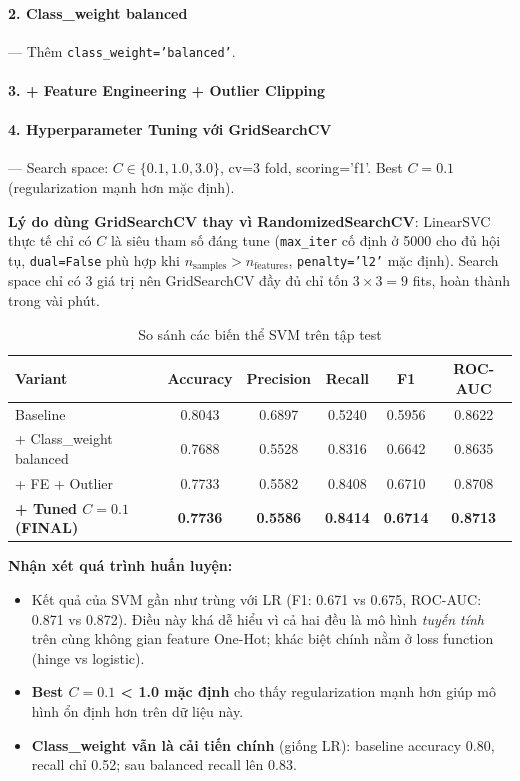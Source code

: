 \documentclass[12pt, a4paper]{article}
\begin{document}
\paragraph{2. Class\_weight balanced} --- Thêm \texttt{class\_weight='balanced'}.

\paragraph{3. + Feature Engineering + Outlier Clipping}

\paragraph{4. Hyperparameter Tuning với GridSearchCV} --- Search space: $C \in \{0.1, 1.0, 3.0\}$, cv=3 fold, scoring='f1'. Best $C = 0.1$ (regularization mạnh hơn mặc định).

\textbf{Lý do dùng GridSearchCV thay vì RandomizedSearchCV}: LinearSVC thực tế chỉ có $C$ là siêu tham số đáng tune (\texttt{max\_iter} cố định ở 5000 cho đủ hội tụ, \texttt{dual=False} phù hợp khi $n_{\text{samples}} > n_{\text{features}}$, \texttt{penalty='l2'} mặc định). Search space chỉ có 3 giá trị nên GridSearchCV đầy đủ chỉ tốn $3 \times 3 = 9$ fits, hoàn thành trong vài phút.

\begin{table}[h!]
\centering
\caption{So sánh các biến thể SVM trên tập test}
\renewcommand{\arraystretch}{1.3}
\begin{tabular}{|l|c|c|c|c|c|}
\hline
\textbf{Variant} & \textbf{Accuracy} & \textbf{Precision} & \textbf{Recall} & \textbf{F1} & \textbf{ROC-AUC} \\ \hline
Baseline                         & 0.8043 & 0.6897 & 0.5240 & 0.5956 & 0.8622 \\ \hline
+ Class\_weight balanced         & 0.7688 & 0.5528 & 0.8316 & 0.6642 & 0.8635 \\ \hline
+ FE + Outlier                   & 0.7733 & 0.5582 & 0.8408 & 0.6710 & 0.8708 \\ \hline
\textbf{+ Tuned $C{=}0.1$ (FINAL)} & \textbf{0.7736} & \textbf{0.5586} & \textbf{0.8414} & \textbf{0.6714} & \textbf{0.8713} \\ \hline
\end{tabular}
\end{table}

\textbf{Nhận xét quá trình huấn luyện:}

\begin{itemize}
    \item Kết quả của SVM gần như trùng với LR (F1: 0.671 vs 0.675, ROC-AUC: 0.871 vs 0.872). Điều này khá dễ hiểu vì cả hai đều là mô hình \emph{tuyến tính} trên cùng không gian feature One-Hot; khác biệt chính nằm ở loss function (hinge vs logistic).

    \item \textbf{Best $C = 0.1$ < 1.0 mặc định} cho thấy regularization mạnh hơn giúp mô hình ổn định hơn trên dữ liệu này.

    \item \textbf{Class\_weight vẫn là cải tiến chính} (giống LR): baseline accuracy 0.80, recall chỉ 0.52; sau balanced recall lên 0.83.
\end{itemize}
\end{document}
